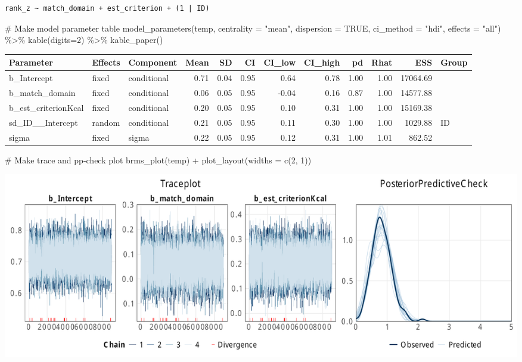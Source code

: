 \documentclass[
  letterpaper,
  DIV=11,
  numbers=noendperiod]{scrartcl}
\newenvironment{Shaded}{\begin{snugshade}}{\end{snugshade}}
\newcommand{\AttributeTok}[1]{\textcolor[rgb]{0.40,0.45,0.13}{#1}}
\newcommand{\CommentTok}[1]{\textcolor[rgb]{0.37,0.37,0.37}{#1}}
\newcommand{\ConstantTok}[1]{\textcolor[rgb]{0.56,0.35,0.01}{#1}}
\newcommand{\DecValTok}[1]{\textcolor[rgb]{0.68,0.00,0.00}{#1}}
\newcommand{\FunctionTok}[1]{\textcolor[rgb]{0.28,0.35,0.67}{#1}}
\newcommand{\NormalTok}[1]{\textcolor[rgb]{0.00,0.23,0.31}{#1}}
\newcommand{\SpecialCharTok}[1]{\textcolor[rgb]{0.37,0.37,0.37}{#1}}
\newcommand{\StringTok}[1]{\textcolor[rgb]{0.13,0.47,0.30}{#1}}
\begin{document}
\begin{verbatim}
rank_z ~ match_domain + est_criterion + (1 | ID) 
\end{verbatim}

\begin{Shaded}
\begin{Highlighting}[]
\CommentTok{\# Make model parameter table}
\FunctionTok{model\_parameters}\NormalTok{(temp, }\AttributeTok{centrality =} \StringTok{"mean"}\NormalTok{, }\AttributeTok{dispersion =} \ConstantTok{TRUE}\NormalTok{, }
                 \AttributeTok{ci\_method =} \StringTok{"hdi"}\NormalTok{, }\AttributeTok{effects =} \StringTok{"all"}\NormalTok{) }\SpecialCharTok{\%\textgreater{}\%} 
  \FunctionTok{kable}\NormalTok{(}\AttributeTok{digits=}\DecValTok{2}\NormalTok{) }\SpecialCharTok{\%\textgreater{}\%} \FunctionTok{kable\_paper}\NormalTok{()}
\end{Highlighting}
\end{Shaded}

\begin{longtable*}[t]{lllrrrrrrrrl}
\toprule
Parameter & Effects & Component & Mean & SD & CI & CI\_low & CI\_high & pd & Rhat & ESS & Group\\
\midrule
b\_Intercept & fixed & conditional & 0.71 & 0.04 & 0.95 & 0.64 & 0.78 & 1.00 & 1.00 & 17064.69 & \\
b\_match\_domain & fixed & conditional & 0.06 & 0.05 & 0.95 & -0.04 & 0.16 & 0.87 & 1.00 & 14577.88 & \\
b\_est\_criterionKcal & fixed & conditional & 0.20 & 0.05 & 0.95 & 0.10 & 0.31 & 1.00 & 1.00 & 15169.38 & \\
sd\_ID\_\_Intercept & random & conditional & 0.21 & 0.05 & 0.95 & 0.11 & 0.30 & 1.00 & 1.00 & 1029.88 & ID\\
sigma & fixed & sigma & 0.22 & 0.05 & 0.95 & 0.12 & 0.31 & 1.00 & 1.01 & 862.52 & \\
\bottomrule
\end{longtable*}

\begin{Shaded}
\begin{Highlighting}[]
\CommentTok{\# Make trace and pp{-}check plot}
\FunctionTok{brms\_plot}\NormalTok{(temp) }\SpecialCharTok{+} \FunctionTok{plot\_layout}\NormalTok{(}\AttributeTok{widths =} \FunctionTok{c}\NormalTok{(}\DecValTok{2}\NormalTok{, }\DecValTok{1}\NormalTok{))}
\end{Highlighting}
\end{Shaded}

\includegraphics{supplement_files/figure-pdf/h3bM1-1.pdf}
\end{document}
